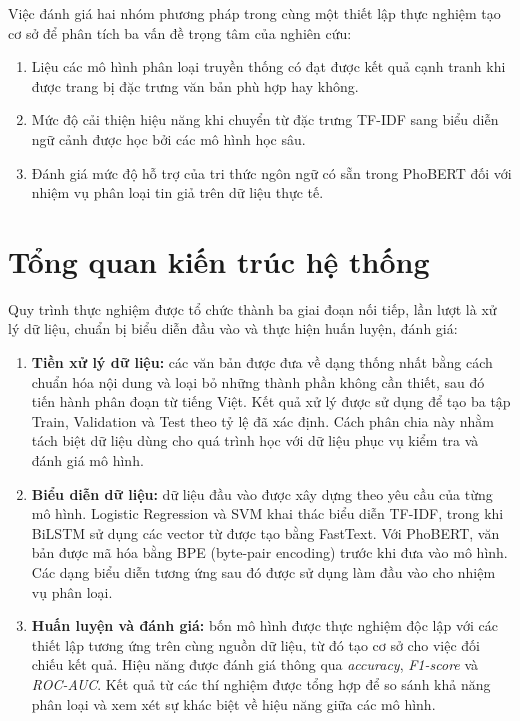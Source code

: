 Việc đánh giá hai nhóm phương pháp trong cùng một thiết lập thực nghiệm tạo cơ sở để phân tích ba vấn đề trọng tâm của nghiên cứu:

\begin{enumerate}
    \item Liệu các mô hình phân loại truyền thống có đạt được kết quả cạnh tranh khi được trang bị đặc trưng văn bản phù hợp hay không.

    \item Mức độ cải thiện hiệu năng khi chuyển từ đặc trưng TF-IDF sang biểu diễn ngữ cảnh được học bởi các mô hình học sâu.

    \item Đánh giá mức độ hỗ trợ của tri thức ngôn ngữ có sẵn trong PhoBERT đối với nhiệm vụ phân loại tin giả trên dữ liệu thực tế.
\end{enumerate}

\section{Tổng quan kiến trúc hệ thống}

Quy trình thực nghiệm được tổ chức thành ba giai đoạn nối tiếp, lần lượt là xử lý dữ liệu, chuẩn bị biểu diễn đầu vào và thực hiện huấn luyện, đánh giá:

\begin{enumerate}[leftmargin=3.3em]

    \item \textbf{Tiền xử lý dữ liệu:} các văn bản được đưa về dạng thống nhất bằng cách chuẩn hóa nội dung và loại bỏ những thành phần không cần thiết, sau đó tiến hành phân đoạn từ tiếng Việt. Kết quả xử lý được sử dụng để tạo ba tập Train, Validation và Test theo tỷ lệ đã xác định. Cách phân chia này nhằm tách biệt dữ liệu dùng cho quá trình học với dữ liệu phục vụ kiểm tra và đánh giá mô hình.

    \item \textbf{Biểu diễn dữ liệu:} dữ liệu đầu vào được xây dựng theo yêu cầu của từng mô hình. Logistic Regression và SVM khai thác biểu diễn TF-IDF, trong khi BiLSTM sử dụng các vector từ được tạo bằng FastText. Với PhoBERT, văn bản được mã hóa bằng BPE (byte-pair encoding) trước khi đưa vào mô hình. Các dạng biểu diễn tương ứng sau đó được sử dụng làm đầu vào cho nhiệm vụ phân loại.

    \item \textbf{Huấn luyện và đánh giá:} bốn mô hình được thực nghiệm độc lập với các thiết lập tương ứng trên cùng nguồn dữ liệu, từ đó tạo cơ sở cho việc đối chiếu kết quả. Hiệu năng được đánh giá thông qua \textit{accuracy}, \textit{F1-score} và \textit{ROC-AUC}. Kết quả từ các thí nghiệm được tổng hợp để so sánh khả năng phân loại và xem xét sự khác biệt về hiệu năng giữa các mô hình.

\end{enumerate}

